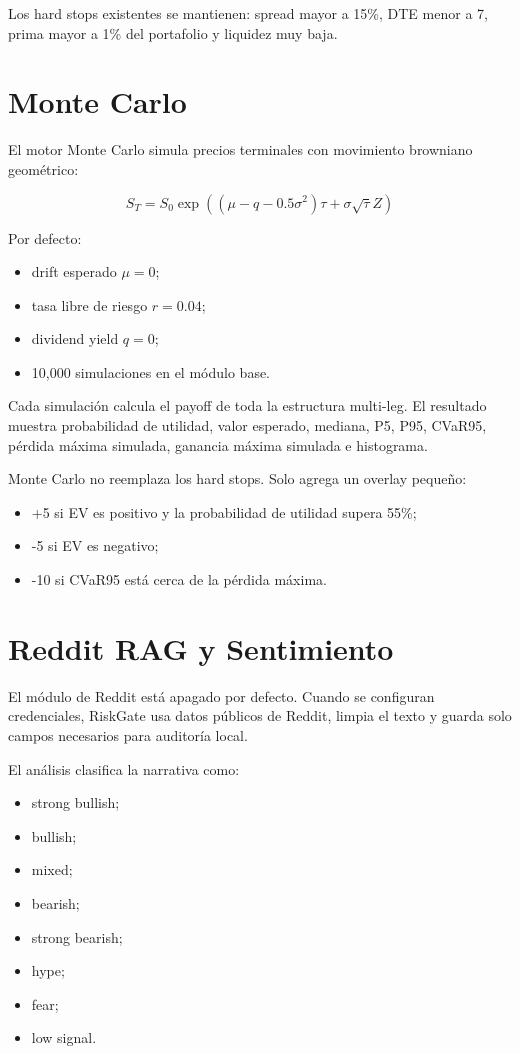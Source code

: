 \documentclass[11pt,letterpaper]{article}
\begin{document}
Los hard stops existentes se mantienen: spread mayor a 15\%, DTE menor a 7, prima mayor a 1\% del portafolio y liquidez muy baja.

\section{Monte Carlo}

El motor Monte Carlo simula precios terminales con movimiento browniano geométrico:

\[
S_T = S_0 \exp((\mu - q - 0.5\sigma^2)\tau + \sigma\sqrt{\tau}Z)
\]

Por defecto:

\begin{itemize}
  \item drift esperado \(\mu = 0\);
  \item tasa libre de riesgo \(r = 0.04\);
  \item dividend yield \(q = 0\);
  \item 10,000 simulaciones en el módulo base.
\end{itemize}

Cada simulación calcula el payoff de toda la estructura multi-leg. El resultado muestra probabilidad de utilidad, valor esperado, mediana, P5, P95, CVaR95, pérdida máxima simulada, ganancia máxima simulada e histograma.

Monte Carlo no reemplaza los hard stops. Solo agrega un overlay pequeño:

\begin{itemize}
  \item +5 si EV es positivo y la probabilidad de utilidad supera 55\%;
  \item -5 si EV es negativo;
  \item -10 si CVaR95 está cerca de la pérdida máxima.
\end{itemize}

\section{Reddit RAG y Sentimiento}

El módulo de Reddit está apagado por defecto. Cuando se configuran credenciales, RiskGate usa datos públicos de Reddit, limpia el texto y guarda solo campos necesarios para auditoría local.

El análisis clasifica la narrativa como:

\begin{itemize}
  \item strong bullish;
  \item bullish;
  \item mixed;
  \item bearish;
  \item strong bearish;
  \item hype;
  \item fear;
  \item low signal.
\end{itemize}
\end{document}
